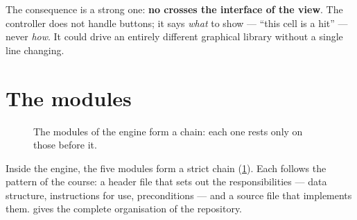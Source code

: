 The consequence is a strong one: \textbf{no  crosses the interface of the
    view}. The controller does not handle buttons; it says \emph{what} to show --- \enquote{this
    cell is a hit} --- never \emph{how}. It could drive an entirely different graphical library
without a single line changing.

\section{The modules}

\begin{figure}[ht]
    \centering
    \caption{The modules of the engine form a chain: each one rests only on those before it.}
    \label{fig-modules}
\end{figure}

Inside the engine, the five modules form a strict chain (\cref{fig-modules}). Each follows
the pattern of the course: a header file that sets out the responsibilities --- data
structure, instructions for use, preconditions --- and a source file that implements them.
 gives the complete organisation of the repository.


